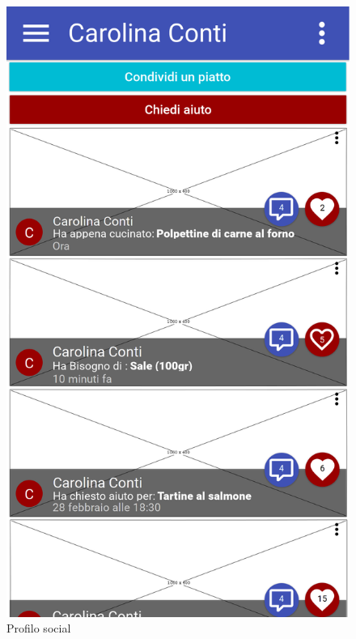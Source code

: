 \begin{figure}[H]
\begin{minipage}{.49\textwidth}
		\includegraphics[width=\textwidth]{img/wireframe/profilo_social.png}
		\caption{Profilo social}
	\end{minipage}
\end{figure}
